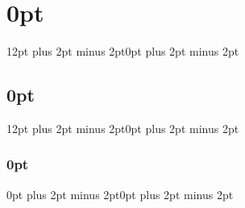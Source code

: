 
\usepackage{orcidlink} %
\usepackage{indentfirst} %
\setlength{\parindent}{0.5in} %
\setlength{\parskip}{0em} %
\usepackage{titlesec} %
\titlespacing\section{0pt}{12pt plus 2pt minus 2pt}{0pt plus 2pt minus 2pt}
\titlespacing\subsection{0pt}{12pt plus 2pt minus 2pt}{0pt plus 2pt minus 2pt}
\titlespacing\subsubsection{0pt}{0pt plus 2pt minus 2pt}{0pt plus 2pt minus 2pt}
          
          
\usepackage{caption}
\captionsetup{
  justification = raggedright, %
  singlelinecheck = true,      %
  font = footnotesize,         %
  labelfont = bf               %
}
\setlength{\abovecaptionskip}{10pt} %


\usepackage{rotating}        
\usepackage{pdflscape}


\usepackage{abstract}
\renewcommand{\abstractname}{ABSTRACT\vspace{.5em}}
\renewcommand{\abstractnamefont}{\normalfont\bfseries}
\renewcommand{\abstracttextfont}{\normalsize}
\setlength{\absleftindent}{\parindent}
\setlength{\absrightindent}{\parindent}


\usepackage{titling}
\setlength{\droptitle}{3em}
\pretitle{\par\vskip 5em\begin{center}\LARGE\bfseries}
\posttitle{\par\end{center}\vspace{2\baselineskip}}


\providecommand{\keywords}[1]{\textbf{\textit{Keywords---}}#1}

\providecommand{\fundting}[1]{\textbf{\textit{Funding: }}#1}

\newcommand{\published}[1]{%
   \gdef\puB{#1}}
   \newcommand{\puB}{}
   \renewcommand{\maketitlehooka}{%
       \par\noindent\footnotesize\sffamily\puB}